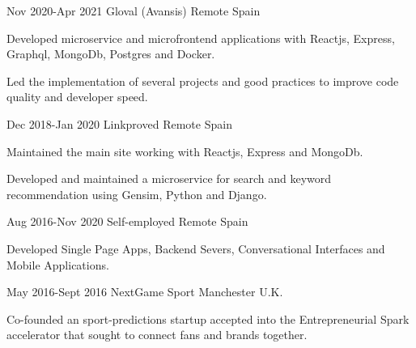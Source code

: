 \documentclass[10pt]{CurriculumVitae}
\begin{document}
      {Nov 2020-Apr 2021}
      {Gloval (Avansis)}
      {Remote}
      {Spain}
      {
        \item Developed microservice and microfrontend applications with Reactjs, Express, Graphql, MongoDb, Postgres and Docker.
        \item Led the implementation of several projects and good practices to improve code quality and developer speed. %
      }

      {Dec 2018-Jan 2020}
      {Linkproved}
      {Remote}
      {Spain}
      {
        \item Maintained the main site working with Reactjs, Express and MongoDb.
        \item Developed and maintained a microservice for search and keyword recommendation using Gensim, Python and Django.
      }
 
      {Aug 2016-Nov 2020}
      {Self-employed}
      {Remote}
      {Spain}
      {
        \item Developed Single Page Apps, Backend Severs, Conversational Interfaces and Mobile Applications.
      }
   
      {May 2016-Sept 2016}
      {NextGame Sport} 
      {Manchester}
      {U.K.}
      {
        \item Co-founded an sport-predictions startup accepted into the Entrepreneurial Spark accelerator that sought to connect fans and brands together.
      }
  
\end{document}
